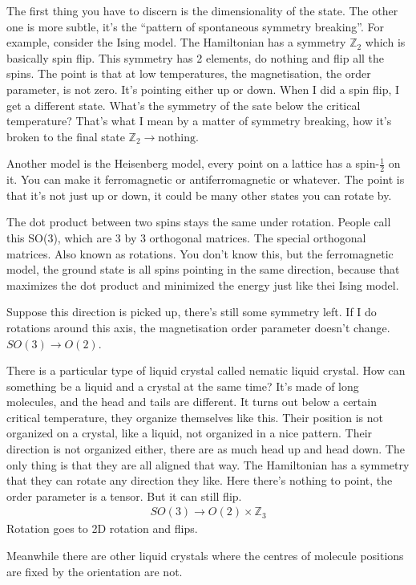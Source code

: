 The first thing you have to discern is the dimensionality of the state.
The other one is more subtle,
it's the ``pattern of spontaneous symmetry breaking''.
For example,
consider the Ising model.
The Hamiltonian has a symmetry $\mathbb{Z}_2$
which is basically spin flip.
This symmetry has 2 elements,
do nothing and flip all the spins.
The point is that at low temperatures,
the magnetisation,
the order parameter,
is not zero.
It's pointing either up or down.
When I did a spin flip,
I get a different state.
What's the symmetry of the sate below the critical temperature?
That's what I mean by a matter of symmetry breaking,
how it's broken to the final state
$\mathbb{Z}_2 \to \textrm{nothing}$.

Another model is the Heisenberg model,
every point on a lattice has a spin-$\frac{1}{2}$ on it.
You can make it ferromagnetic or antiferromagnetic or whatever.
The point is that it's not just up or down,
it could be many other states you can rotate by.

The dot product between two spins stays the same under rotation.
People call this SO(3),
which are 3 by 3 orthogonal matrices.
The special orthogonal matrices.
Also known as rotations.
You don't know this,
but the ferromagnetic model,
the ground state is all spins pointing in the same direction,
because that maximizes the dot product and minimized the energy just like thei
Ising model.

Suppose this direction is picked up,
there's still some symmetry left.
If I do rotations around this axis,
the magnetisation order parameter doesn't change.
$SO(3) \to O(2)$.

There is a particular type of liquid crystal called nematic liquid crystal.
How can something be a liquid and a crystal at the same time?
It's made of long molecules,
and the head and tails are different.
It turns out below a certain critical temperature,
they organize themselves like this.
Their position is not organized on a crystal,
like a liquid,
not organized in a nice pattern.
Their direction is not organized either,
there are as much head up and head down.
The only thing is that they are all aligned that way.
The Hamiltonian has a symmetry that they can rotate any direction they like.
Here there's nothing to point,
the order parameter is a tensor.
But it can still flip.
\begin{align}
    SO(3) \to O(2)\times \mathbb{Z}_3
\end{align}
Rotation goes to 2D rotation and flips.

Meanwhile there are other liquid crystals
where the centres of molecule positions are fixed by the orientation are not.

